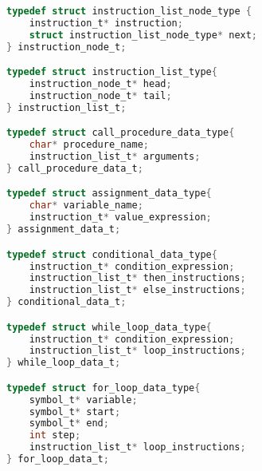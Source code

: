 \lstset{style=mystyle}
\begin{lstlisting}[language=C, caption=Structure pour une liste instruction]
typedef struct instruction_list_node_type {
    instruction_t* instruction;
    struct instruction_list_node_type* next;
} instruction_node_t;

typedef struct instruction_list_type{
    instruction_node_t* head;
    instruction_node_t* tail;
} instruction_list_t;

typedef struct call_procedure_data_type{
    char* procedure_name;
    instruction_list_t* arguments;
} call_procedure_data_t;

typedef struct assignment_data_type{
    char* variable_name;
    instruction_t* value_expression;
} assignment_data_t;

typedef struct conditional_data_type{
    instruction_t* condition_expression;
    instruction_list_t* then_instructions;
    instruction_list_t* else_instructions;
} conditional_data_t;

typedef struct while_loop_data_type{
    instruction_t* condition_expression;
    instruction_list_t* loop_instructions;
} while_loop_data_t;

typedef struct for_loop_data_type{
    symbol_t* variable;
    symbol_t* start;
    symbol_t* end;
    int step;
    instruction_list_t* loop_instructions;
} for_loop_data_t;
\end{lstlisting}

\newpage